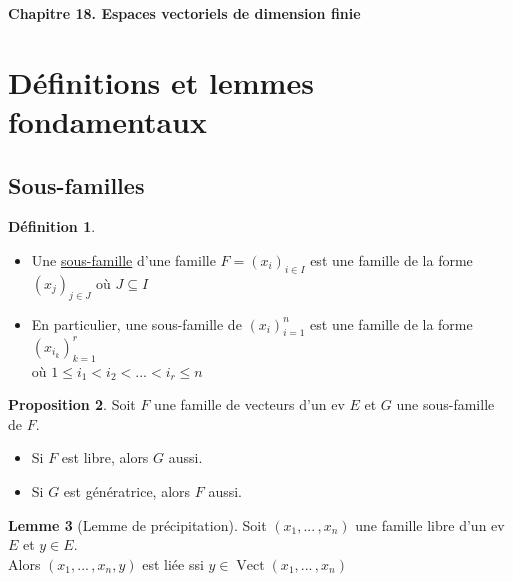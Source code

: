 \documentclass[10pt,a4paper]{article}
\theoremstyle{definition}
\newtheorem{proposition}{Proposition}[section]
\newtheorem{lemme}[proposition]{Lemme}
\newtheorem{definition}[proposition]{Définition}
\DeclareMathOperator{\vect}{Vect}
\begin{document}
\renewcommand{\labelitemi}{$*$}
\renewcommand{\labelenumi}{(\roman{enumi})}
\begin{center}
{\Large \textbf{Chapitre 18. Espaces vectoriels de dimension finie}}
\end{center}

\section{Définitions et lemmes fondamentaux}
\subsection{Sous-familles}
\begin{definition}
\hfill
\begin{itemize}
\item Une \uline{sous-famille} d'une famille $F = (x_i)_{i \in I}$ est une famille de la forme $(x_j)_{j \in J}$ où $J \subseteq I$
\item En particulier, une sous-famille de $(x_i)_{i = 1}^n$ est une famille de la forme $(x_{i_k})_{k = 1}^r$  \\
où $1 \leq i_1 < i_2 < ... < i_r \leq n$
\end{itemize}
\end{definition}
\begin{proposition}
Soit $F$ une famille de vecteurs d'un ev $E$ et $G$ une sous-famille de $F$.
\begin{itemize}
\item Si $F$ est libre, alors $G$ aussi.
\item Si $G$ est génératrice, alors $F$ aussi.
\end{itemize}
\end{proposition}
\begin{lemme}[Lemme de précipitation]
Soit $(x_1, ...\, , x_n)$ une famille libre d'un ev $E$ et $y \in E$. \\
Alors $(x_1, ...\, , x_n, y)$ est liée ssi $y \in \vect(x_1, ...\, , x_n)$
\end{lemme}
\end{document}
